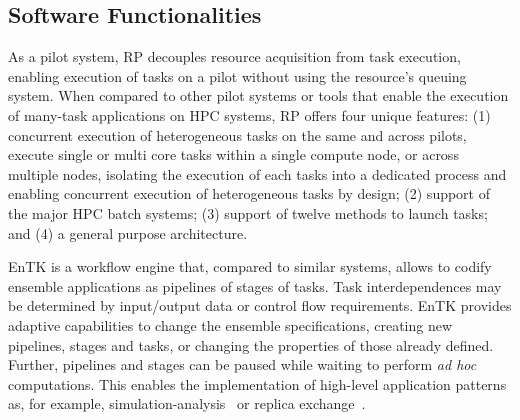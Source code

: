 \documentclass[preprint,12pt, a4paper]{elsarticle}
\begin{document}
\subsection{Software Functionalities}\label{ssec:functionalities}


As a pilot system, RP decouples resource acquisition from task execution,
enabling execution of tasks on a pilot without using the resource's queuing
system.
%
%
When compared to other pilot systems or tools that enable the execution of
many-task applications on HPC systems, RP offers four unique features: (1)
concurrent execution of heterogeneous tasks on the same and across pilots,
execute single or multi core tasks within a single compute node, or across
multiple nodes, isolating the execution of each tasks into a dedicated
process and enabling concurrent execution of heterogeneous tasks by design;
(2) support of the major HPC batch systems; (3) support of twelve methods to
launch tasks; and (4) a general purpose architecture.


EnTK is a workflow engine that, compared to similar systems, allows to codify
ensemble applications as pipelines of stages of tasks. Task interdependences
may be determined by input/output data or control flow requirements.
%
%
EnTK provides adaptive capabilities to change the ensemble specifications,
creating new pipelines, stages and tasks, or changing the properties of those
already defined. Further, pipelines and stages can be paused while waiting to
perform \textit{ad hoc} computations. This enables the implementation of
high-level application patterns as, for example,
simulation-analysis~\cite{balasubramanian2016extasy} or replica
exchange~\cite{treikalis2016repex}.
\end{document}
